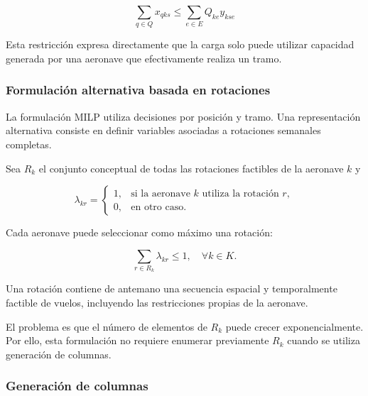 \[
\boxed{
\sum_{q\in Q}x_{qks}
\leq
\sum_{e\in E}Q_{ke}y_{kse}
}
\]

Esta restricción expresa directamente que la carga solo puede utilizar capacidad generada por
una aeronave que efectivamente realiza un tramo.


\subsubsection{Formulación alternativa basada en rotaciones}
\label{app:route_formulation}

La formulación MILP utiliza decisiones por posición y tramo. Una representación alternativa
consiste en definir variables asociadas a rotaciones semanales completas.

Sea $R_k$ el conjunto conceptual de todas las rotaciones factibles de la aeronave $k$ y

\begin{equation}
\lambda_{kr}
=
\begin{cases}
1, & \text{si la aeronave $k$ utiliza la rotación $r$},\\
0, & \text{en otro caso}.
\end{cases}
\label{eq:lambda}
\end{equation}

Cada aeronave puede seleccionar como máximo una rotación:

\begin{equation}
\sum_{r\in R_k}\lambda_{kr}
\leq1,
\quad
\forall k\in K.
\label{eq:one_rotation}
\end{equation}

Una rotación contiene de antemano una secuencia espacial y temporalmente factible de vuelos,
incluyendo las restricciones propias de la aeronave.

El problema es que el número de elementos de $R_k$ puede crecer exponencialmente. Por ello,
esta formulación no requiere enumerar previamente $R_k$ cuando se utiliza generación de
columnas.


\subsubsection{Generación de columnas}
\label{app:column_generation}

